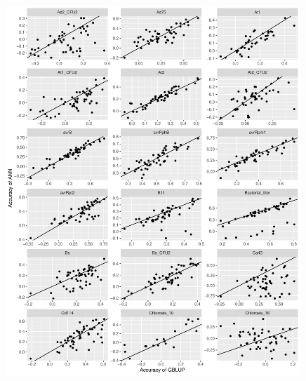 \begin{figure}[H]
  \centering \includegraphics[height=1.05\textheight, width=0.99\textwidth]{Figures/cor_plots_1}
  \decoRule
 \label{fig:bla}
\end{figure}

